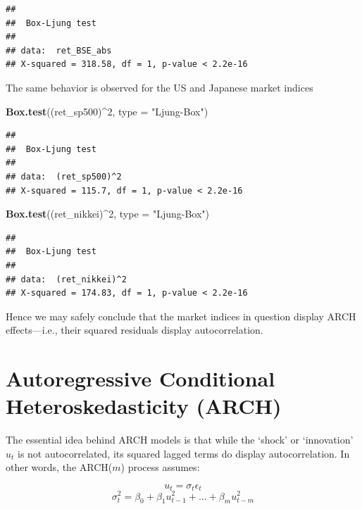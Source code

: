 \documentclass[11pt,]{article}
\newenvironment{Shaded}{\begin{snugshade}}{\end{snugshade}}
\newcommand{\KeywordTok}[1]{\textcolor[rgb]{0.13,0.29,0.53}{\textbf{#1}}}
\newcommand{\DataTypeTok}[1]{\textcolor[rgb]{0.13,0.29,0.53}{#1}}
\newcommand{\DecValTok}[1]{\textcolor[rgb]{0.00,0.00,0.81}{#1}}
\newcommand{\StringTok}[1]{\textcolor[rgb]{0.31,0.60,0.02}{#1}}
\newcommand{\OperatorTok}[1]{\textcolor[rgb]{0.81,0.36,0.00}{\textbf{#1}}}
\newcommand{\NormalTok}[1]{#1}
\begin{document}
\begin{verbatim}
## 
##  Box-Ljung test
## 
## data:  ret_BSE_abs
## X-squared = 318.58, df = 1, p-value < 2.2e-16
\end{verbatim}

The same behavior is observed for the US and Japanese market indices

\begin{Shaded}
\begin{Highlighting}[]
\KeywordTok{Box.test}\NormalTok{((ret_sp500)}\OperatorTok{^}\DecValTok{2}\NormalTok{, }\DataTypeTok{type =} \StringTok{"Ljung-Box"}\NormalTok{) }
\end{Highlighting}
\end{Shaded}

\begin{verbatim}
## 
##  Box-Ljung test
## 
## data:  (ret_sp500)^2
## X-squared = 115.7, df = 1, p-value < 2.2e-16
\end{verbatim}

\begin{Shaded}
\begin{Highlighting}[]
\KeywordTok{Box.test}\NormalTok{((ret_nikkei)}\OperatorTok{^}\DecValTok{2}\NormalTok{, }\DataTypeTok{type =} \StringTok{"Ljung-Box"}\NormalTok{) }
\end{Highlighting}
\end{Shaded}

\begin{verbatim}
## 
##  Box-Ljung test
## 
## data:  (ret_nikkei)^2
## X-squared = 174.83, df = 1, p-value < 2.2e-16
\end{verbatim}

Hence we may safely conclude that the market indices in question display
ARCH effects---i.e., their squared residuals display autocorrelation.

\section{Autoregressive Conditional Heteroskedasticity
(ARCH)}\label{autoregressive-conditional-heteroskedasticity-arch}

The essential idea behind ARCH models is that while the `shock' or
`innovation' \(u_t\) is not autocorrelated, its squared lagged terms do
display autocorrelation. In other words, the ARCH(\(m\)) process
assumes:

\[u_t = \sigma_t\epsilon_t\]
\[\sigma_t^2 = \beta_0 + \beta_1u_{t-1}^2+\hdots+\beta_mu_{t-m}^2\]
\end{document}
